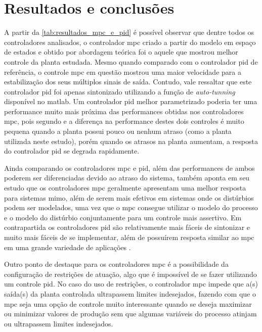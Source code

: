 \chapter{Resultados e conclusões}
\label{ch:resultados}

A partir da \cref{tab:resultados_mpc_e_pid} é possível observar que dentre todos os controladores analisados,
o controlador \acrshort{mpc} criado a partir do modelo em espaço de estados e obtido por abordagem teórica
foi o aquele que mostrou melhor controle da planta estudada. Mesmo quando comparado com o controlador 
\acrshort{pid} de referência, o controle \acrshort{mpc} em questão mostrou uma maior velocidade para a estabilização
dos seus múltiplos sinais de saída. Contudo, vale ressaltar que este controlador \acrshort{pid} 
foi apenas sintonizado utilizando a função de \textit{auto-tunning} disponível no \acrshort{matlab}.
Um controlador \acrshort{pid} melhor parametrizado poderia ter uma performance muito mais próxima das 
performances obtidas nos controladores \acrshort{mpc}, pois segundo  e
 a diferença na performance destes dois controles é muito pequena quando
a planta possui pouco ou nenhum atraso (como a planta utilizada neste estudo), porém quando os atrasos
na planta aumentam, a resposta do controlador \acrshort{pid} se degrada rapidamente.

Ainda comparando os controladores \acrshort{mpc} e \acrshort{pid}, além das performances de ambos poderem ser
diferenciadas devido ao atraso do sistema,  também aponta em seu estudo que os
controladores \acrshort{mpc} geralmente apresentam uma melhor resposta para sistemas \acrshort{mimo},
além de serem mais efetivos em sistemas onde os distúrbios podem ser modelados, uma vez que o
\acrshort{mpc} consegue utilizar o modelo do processo e o modelo do distúrbio conjuntamente para um 
controle mais assertivo. Em contrapartida os controladores \acrshort{pid} são relativamente mais
fáceis de sintonizar e muito mais fáceis de se implementar, além de possuírem resposta similar ao \acrshort{mpc}
em uma grande variedade de aplicações \cite{Taysom2017}.

Outro ponto de destaque para os controladores \acrshort{mpc} é a possibilidade da configuração de
restrições de atuação, algo que é impossível de se fazer utilizando um controle \acrshort{pid}.
No caso do uso de restrições, o controlador \acrshort{mpc} impede que a(s) saída(s) da planta controlada
ultrapassem limites indesejados, fazendo com que o \acrshort{mpc} seja uma opção de controle muito
interessante quando se deseja maximizar ou minimizar valores de produção sem que algumas variáveis
do processo atinjam ou ultrapassem limites indesejados.

